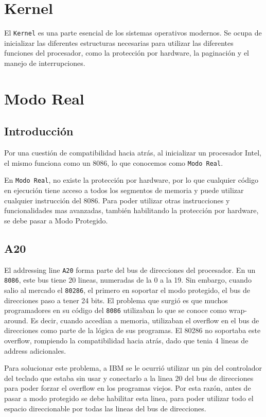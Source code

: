 \section{Kernel}

El \texttt{Kernel} es una parte esencial de los sistemas operativos modernos. Se ocupa de inicializar las diferentes estructuras necesarias para utilizar las diferentes funciones del procesador, como la protección por hardware, la paginación y el manejo de interrupciones.

\section{Modo Real}

\subsection{Introducción}

Por una cuestión de compatibilidad hacia atrás, al inicializar un procesador Intel, el mismo funciona como un 8086, lo que conocemos como \texttt{Modo Real}. 

En \texttt{Modo Real}, no existe la protección por hardware, por lo que cualquier código en ejecución tiene acceso a todos los segmentos de memoria y puede utilizar cualquier instrucción del 8086. Para poder utilizar otras instrucciones y funcionalidades mas avanzadas, también habilitando la protección por hardware, se debe pasar a Modo Protegido.

\subsection{A20}
El addressing line \texttt{A20} forma parte del bus de direcciones del procesador. En un \texttt{8086}, este bus tiene 20 lineas, numeradas de la 0 a la 19. Sin embargo, cuando salio al mercado el \texttt{80286}, el primero en soportar el modo protegido,  el bus de direcciones paso a tener 24 bits. El problema que surgió es que muchos programadores en su código del \texttt{8086} utilizaban lo que se conoce como wrap-around. Es decir, cuando accedían a memoria, utilizaban el overflow en el bus de direcciones como parte de la lógica de sus programas. El 80286 no soportaba este overflow, rompiendo la compatibilidad hacia atrás, dado que tenia 4 lineas de address adicionales.

Para solucionar este problema, a IBM se le ocurrió utilizar un pin del controlador del teclado que estaba sin usar y conectarlo a la linea 20 del bus de direcciones para poder forzar el overflow en los programas viejos. Por esta razón, antes de pasar a modo protegido se debe habilitar esta linea, para poder utilizar todo el espacio direccionable por todas las lineas del bus de direcciones.


